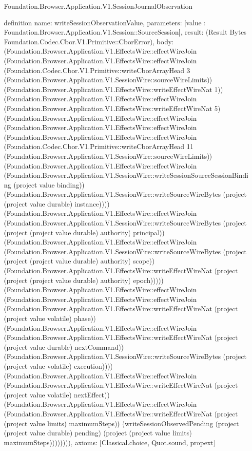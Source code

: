 \begin{lexlean}{Foundation.Browser.Application.V1.SessionJournalObservation}
\begin{semanticmodule}
definition{
  name: writeSessionObservationValue,
  parameters: [value : Foundation.Browser.Application.V1.Session::SourceSession],
  result: (Result Bytes Foundation.Codec.Cbor.V1.Primitive::CborError),
  body: (Foundation.Browser.Application.V1.EffectsWire::effectWireJoin (Foundation.Browser.Application.V1.EffectsWire::effectWireJoin (Foundation.Codec.Cbor.V1.Primitive::writeCborArrayHead 3 (Foundation.Browser.Application.V1.SessionWire::sourceWireLimits)) (Foundation.Browser.Application.V1.EffectsWire::writeEffectWireNat 1)) (Foundation.Browser.Application.V1.EffectsWire::effectWireJoin (Foundation.Browser.Application.V1.EffectsWire::writeEffectWireNat 5) (Foundation.Browser.Application.V1.EffectsWire::effectWireJoin (Foundation.Browser.Application.V1.EffectsWire::effectWireJoin (Foundation.Browser.Application.V1.EffectsWire::effectWireJoin (Foundation.Codec.Cbor.V1.Primitive::writeCborArrayHead 11 (Foundation.Browser.Application.V1.SessionWire::sourceWireLimits)) (Foundation.Browser.Application.V1.EffectsWire::effectWireJoin (Foundation.Browser.Application.V1.SessionWire::writeSessionSourceSessionBinding (project value binding)) (Foundation.Browser.Application.V1.SessionWire::writeSourceWireBytes (project (project value durable) instance)))) (Foundation.Browser.Application.V1.EffectsWire::effectWireJoin (Foundation.Browser.Application.V1.SessionWire::writeSourceWireBytes (project (project (project value durable) authority) principal)) (Foundation.Browser.Application.V1.EffectsWire::effectWireJoin (Foundation.Browser.Application.V1.SessionWire::writeSourceWireBytes (project (project (project value durable) authority) scope)) (Foundation.Browser.Application.V1.EffectsWire::writeEffectWireNat (project (project (project value durable) authority) epoch))))) (Foundation.Browser.Application.V1.EffectsWire::effectWireJoin (Foundation.Browser.Application.V1.EffectsWire::effectWireJoin (Foundation.Browser.Application.V1.EffectsWire::writeEffectWireNat (project (project value volatile) phase)) (Foundation.Browser.Application.V1.EffectsWire::effectWireJoin (Foundation.Browser.Application.V1.EffectsWire::writeEffectWireNat (project (project value durable) nextCommand)) (Foundation.Browser.Application.V1.SessionWire::writeSourceWireBytes (project (project value volatile) execution)))) (Foundation.Browser.Application.V1.EffectsWire::effectWireJoin (Foundation.Browser.Application.V1.EffectsWire::writeEffectWireNat (project (project value volatile) nextEffect)) (Foundation.Browser.Application.V1.EffectsWire::effectWireJoin (Foundation.Browser.Application.V1.EffectsWire::writeEffectWireNat (project (project value limits) maximumSteps)) (writeSessionObservedPending (project (project value durable) pending) (project (project value limits) maximumSteps)))))))),
  axioms: [Classical.choice, Quot.sound, propext]
}


\end{semanticmodule}
\end{lexlean}
